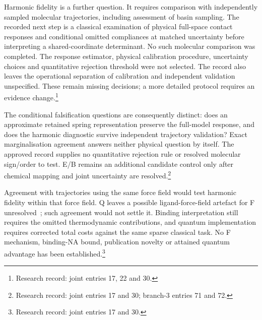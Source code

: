 \documentclass{article}
\begin{document}
Harmonic fidelity is a further question. It requires comparison with independently sampled molecular trajectories, including assessment of basin sampling. The recorded next step is a classical examination of physical full-space contact responses and conditional omitted compliances at matched uncertainty before interpreting a shared-coordinate determinant. No such molecular comparison was completed. The response estimator, physical calibration procedure, uncertainty choices and quantitative rejection threshold were not selected. The record also leaves the operational separation of calibration and independent validation unspecified. These remain missing decisions; a more detailed protocol requires an evidence change.\footnote{Research record: joint entries 17, 22 and 30.}

The conditional falsification questions are consequently distinct: does an approximate retained spring representation preserve the full-model response, and does the harmonic diagnostic survive independent trajectory validation? Exact marginalisation agreement answers neither physical question by itself. The approved record supplies no quantitative rejection rule or resolved molecular sign/order to test. E/B remains an additional candidate control only after chemical mapping and joint uncertainty are resolved.\footnote{Research record: joint entries 17 and 30; branch-3 entries 71 and 72.}

Agreement with trajectories using the same force field would test harmonic fidelity within that force field. Q leaves a possible ligand-force-field artefact for F unresolved~\cite{Q}; such agreement would not settle it. Binding interpretation still requires the omitted thermodynamic contributions, and quantum implementation requires corrected total costs against the same sparse classical task. No F mechanism, binding-NA bound, publication novelty or attained quantum advantage has been established.\footnote{Research record: joint entries 17 and 30.}

\clearpage


\end{document}
